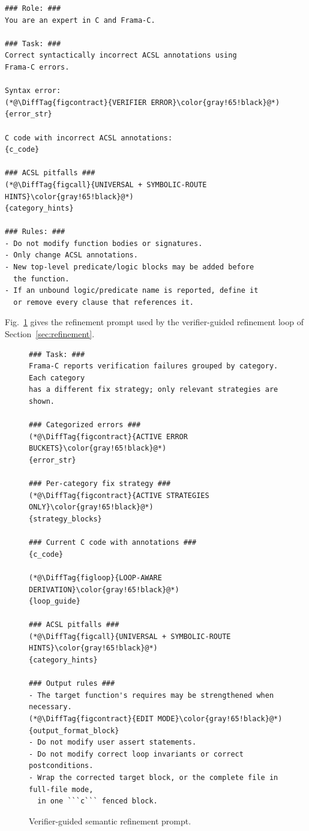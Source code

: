 \begin{tcolorbox}[promptboxcompact, title={Syntax-repair prompt}]
\begin{lstlisting}[style=PromptInnerCompact]
### Role: ###
You are an expert in C and Frama-C.

### Task: ###
Correct syntactically incorrect ACSL annotations using
Frama-C errors.

Syntax error:
(*@\DiffTag{figcontract}{VERIFIER ERROR}\color{gray!65!black}@*)
{error_str}

C code with incorrect ACSL annotations:
{c_code}

### ACSL pitfalls ###
(*@\DiffTag{figcall}{UNIVERSAL + SYMBOLIC-ROUTE HINTS}\color{gray!65!black}@*)
{category_hints}

### Rules: ###
- Do not modify function bodies or signatures.
- Only change ACSL annotations.
- New top-level predicate/logic blocks may be added before
  the function.
- If an unbound logic/predicate name is reported, define it
  or remove every clause that references it.
\end{lstlisting}
\end{tcolorbox}


Fig.~\ref{fig:prompt-refine} gives the refinement prompt used by the verifier-guided refinement loop of Section~\ref{sec:refinement}.

\begin{figure}[H]
\centering
\begin{tcolorbox}[promptboxcompact, title={Verifier-guided refinement prompt}, width=\columnwidth]
\begin{lstlisting}[style=PromptInnerCompact]
### Task: ###
Frama-C reports verification failures grouped by category. Each category
has a different fix strategy; only relevant strategies are shown.

### Categorized errors ###
(*@\DiffTag{figcontract}{ACTIVE ERROR BUCKETS}\color{gray!65!black}@*)
{error_str}

### Per-category fix strategy ###
(*@\DiffTag{figcontract}{ACTIVE STRATEGIES ONLY}\color{gray!65!black}@*)
{strategy_blocks}

### Current C code with annotations ###
{c_code}

(*@\DiffTag{figloop}{LOOP-AWARE DERIVATION}\color{gray!65!black}@*)
{loop_guide}

### ACSL pitfalls ###
(*@\DiffTag{figcall}{UNIVERSAL + SYMBOLIC-ROUTE HINTS}\color{gray!65!black}@*)
{category_hints}

### Output rules ###
- The target function's requires may be strengthened when necessary.
(*@\DiffTag{figcontract}{EDIT MODE}\color{gray!65!black}@*)
{output_format_block}
- Do not modify user assert statements.
- Do not modify correct loop invariants or correct postconditions.
- Wrap the corrected target block, or the complete file in full-file mode,
  in one ```c``` fenced block.
\end{lstlisting}
\end{tcolorbox}
\caption{Verifier-guided semantic refinement prompt.}
\label{fig:prompt-refine}
\end{figure}
